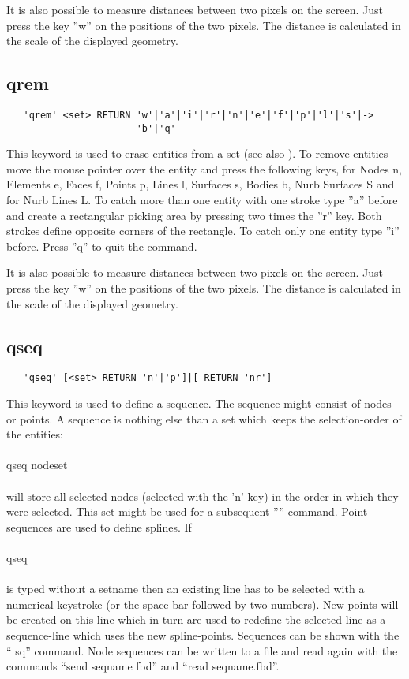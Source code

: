 \documentclass{article}
\begin{document}
It is also possible to measure distances between two pixels on the screen. Just press the key ''w'' on the positions of the two pixels. The distance is calculated in the scale of the displayed geometry.  

\subsection{\label{qrem}qrem}
\begin{verbatim}
   'qrem' <set> RETURN 'w'|'a'|'i'|'r'|'n'|'e'|'f'|'p'|'l'|'s'|->
                       'b'|'q' 
\end{verbatim}
This keyword is used to erase entities from a set (see also ). To remove entities move the mouse pointer over the entity and press the following keys, for Nodes n, Elements e, Faces f, Points p, Lines l, Surfaces s, Bodies b, Nurb Surfaces S and for Nurb Lines L. To catch more than one entity with one stroke type ''a'' before and create a rectangular picking area by pressing two times the ''r'' key. Both strokes define opposite corners of the rectangle. To catch only one entity type ''i'' before. Press ''q'' to quit the command. 

It is also possible to measure distances between two pixels on the screen. Just press the key ''w'' on the positions of the two pixels. The distance is calculated in the scale of the displayed geometry.

\subsection{\label{qseq}qseq}
\begin{verbatim}
   'qseq' [<set> RETURN 'n'|'p']|[ RETURN 'nr'] 
\end{verbatim}
This keyword is used to define a sequence. The sequence might consist of nodes or points. A sequence is nothing else than a set which keeps the selection-order of the entities:\\\\qseq nodeset\\\\will store all selected nodes (selected with the 'n' key) in the order in which they were selected. This set might be used for a subsequent '''' command. Point sequences are used to define splines. If\\\\qseq\\\\is typed without a setname then an existing line has to be selected with a numerical keystroke (or the space-bar followed by two numbers). New points will be created on this line which in turn are used to redefine the selected line as a sequence-line which uses the new spline-points. Sequences can be shown with the `` sq'' command. Node sequences can be written to a file and read again with the commands ``send seqname fbd'' and ``read seqname.fbd''.
\end{document}
